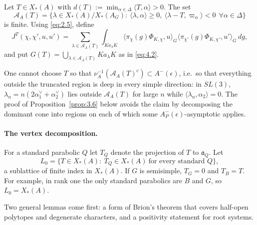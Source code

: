 \documentclass[12pt,letterpaper]{article}
\numberwithin{equation}{section}
\theoremstyle{plain}
\theoremstyle{remark}
\theoremstyle{plain}
\theoremstyle{definition}
\theoremstyle{remark}
\theoremstyle{remark}
\newcommand{\cA}{\mathcal{A}}
\newcommand{\fa}{\mathfrak{a}}
\newcommand{\ip}[1]{\langle #1\rangle}
\begin{document}
Let $T\in X_*(A)$ with $d(T):=\min_{\alpha\in\Delta}\ip{T,\alpha}>0$. The set
\begin{equation}\label{eq:3.3}
\cA_A(T)=\big\{\lambda\in X_*(A)/X_*(A_G):\ \ip{\lambda,\alpha}\ge0,\ \ip{\lambda-T,\varpi_\alpha}<0\ \ \forall\alpha\in\Delta\big\}
\end{equation}
is finite. Using \eqref{eq:2.5}, define
\begin{equation}\label{eq:3.4}
J^T(\chi,\chi',u,u')=\sum_{\lambda\in\cA_A(T)}\int_{Ka_\lambda K}\ip{\pi_\chi(g)\Phi_{K,\chi},u}_G\ip{\pi_{\chi'}(g)\Phi_{K,\chi'},u'}_G\,dg,
\end{equation}
and put $G(T)=\bigcup_{\lambda\in\cA_A(T)}Ka_\lambda K$ as in \eqref{eq:4.2}.

\begin{rem26}
One cannot choose $T$ so that $\nu_A^{-1}(\cA_A(T)^c)\subset A^-(\epsilon)$, i.e.\ so that everything outside the truncated region is deep in every simple direction: in $SL(3)$, $\lambda_n=n(2\alpha_1^\vee+\alpha_2^\vee)$ lies outside $\cA_A(T)$ for large $n$ while $\ip{\lambda_n,\alpha_2}=0$. The proof of Proposition~\ref{prop:3.6} below avoids the claim by decomposing the dominant cone into regions on each of which some $A^-_P(\epsilon)$-asymptotic applies.
\end{rem26}

\paragraph{The vertex decomposition.} For a standard parabolic $Q$ let $T_Q$ denote the projection of $T$ to $\fa_Q$. Let
\[
L_0=\{T\in X_*(A):\ T_Q\in X_*(A)\ \text{for every standard }Q\},
\]
a sublattice of finite index in $X_*(A)$. If $G$ is semisimple, $T_G=0$ and $T_B=T$. For example, in rank one the only standard parabolics are $B$ and $G$, so $L_0=X_*(A)$.

Two general lemmas come first: a form of Brion's theorem that covers half-open polytopes and degenerate characters, and a positivity statement for root systems.
\end{document}
